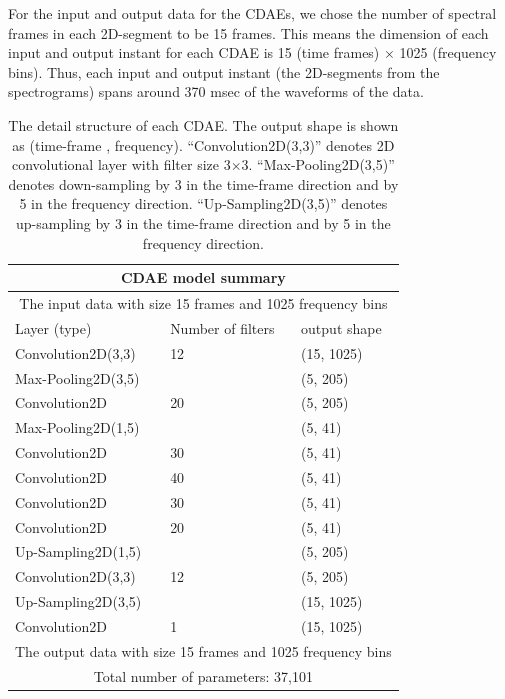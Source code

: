 \documentclass{article}
\begin{document}
For the input and output data for the CDAEs, we chose the number of spectral frames in each 2D-segment to be 15 frames. This means the dimension of each input and output instant for each CDAE is 15 (time frames) $\times$ 1025 (frequency bins). Thus, each input and output instant (the 2D-segments from the spectrograms) spans around 370 msec of the waveforms of the data.  
%
\begin{table}
\scalebox{0.95}
{
\begin{tabular}{ |p{3cm}||p{2.5cm}|p{2cm}|}
 \hline
 \multicolumn{3}{|c|}{CDAE model summary} \\
 \hline
 \multicolumn{3}{|c|}{The input data with size 15 frames and 1025 frequency bins} \\
 \hline
 Layer (type)         & Number of filters & output shape \\
  \hline
 Convolution2D(3,3)   & 12    & (15, 1025) \\
  Max-Pooling2D(3,5)    &        & (5, 205) \\
  \hline 
 Convolution2D        & 20     & (5, 205) \\
  Max-Pooling2D(1,5)    &        & (5, 41) \\
 \hline 
 Convolution2D        & 30     & (5, 41) \\
  \hline 
 Convolution2D        & 40     & (5, 41) \\
  \hline 
 Convolution2D        & 30     & (5, 41) \\
  \hline 
 Convolution2D        & 20      & (5, 41) \\
  Up-Sampling2D(1,5)   &        & (5, 205) \\
  \hline 
Convolution2D(3,3)    & 12      & (5, 205) \\
Up-Sampling2D(3,5)     &       & (15, 1025) \\
\hline 
 Convolution2D        & 1      & (15, 1025) \\
  \hline
 \multicolumn{3}{|c|}{The output data with size 15 frames and 1025 frequency bins} \\
 \multicolumn{3}{|c|}{Total number of parameters: 37,101}\\
 \hline
\end{tabular}
}
\caption{{The detail structure of each CDAE. The output shape is shown as (time-frame , frequency). ``Convolution2D(3,3)'' denotes 2D convolutional layer with filter size 3$\times$3. ``Max-Pooling2D(3,5)'' denotes down-sampling by 3 in the time-frame direction and by 5 in the frequency direction. ``Up-Sampling2D(3,5)'' denotes up-sampling by 3 in the time-frame direction and by 5 in the frequency direction.}}
\label{table:cdae} %
\end{table}
\end{document}
